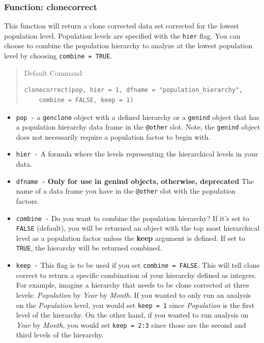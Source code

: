 \documentclass[letterpaper]{article}\usepackage[]{graphicx}\usepackage[]{color}
\makeatletter
\newenvironment{kframe}{%
 \def\at@end@of@kframe{}%
 \ifinner\ifhmode%
  \def\at@end@of@kframe{\end{minipage}}%
  \begin{minipage}{\columnwidth}%
 \fi\fi%
 \def\FrameCommand##1{\hskip\@totalleftmargin \hskip-\fboxsep
 \colorbox{shadecolor}{##1}\hskip-\fboxsep
     \hskip-\linewidth \hskip-\@totalleftmargin \hskip\columnwidth}%
 \MakeFramed {\advance\hsize-\width
   \@totalleftmargin\z@ \linewidth\hsize
   \@setminipage}}%
 {\par\unskip\endMakeFramed%
 \at@end@of@kframe}
\newenvironment{knitrout}{}{} %
\newcommand{\tab}{\hspace*{1em}}
\makeatother
\begin{document}
\subsubsection{Function: clonecorrect}
\label{data.manip:cc:clonecorrect}

\tab\tab This function will return a clone corrected data set corrected for the
lowest population level. Population levels are specified with the \texttt{hier}
flag. You can choose to combine the population hierarchy to analyze at the
lowest population level by choosing \texttt{combine = TRUE}.

\begin{quote}
Default Command:
\begin{knitrout}
\color{fgcolor}\begin{kframe}
\begin{verbatim}
clonecorrect(pop, hier = 1, dfname = "population_hierarchy", 
    combine = FALSE, keep = 1)
\end{verbatim}
\end{kframe}
\end{knitrout}

\end{quote}
\begin{itemize}
  \item \texttt{pop -} a \texttt{genclone} object with a defined hierarchy or a
   \texttt{genind} object that has a population hierarchy data frame in the 
   \texttt{@other} slot. Note, the \texttt{genind} object does not necessarily 
   require a population factor to begin with. 
  \item \texttt{hier -} A formula where the levels representing the hierarchical
   levels in your data. 
  \item \texttt{dfname -} \textbf{Only for use in genind objects, otherwise, deprecated}
   The name of a data frame you have in the \texttt{@other} slot with the population factors. 
  \item \texttt{combine -} Do you want to combine the population hierarchy? 
   If it's set to \texttt{FALSE} (default), you will be returned an object with 
   the top most hierarchical level as a population factor unless the \textbf{keep}
   argument is defined. If set to \texttt{TRUE}, the hierarchy will be returned
   combined. 
  \item \texttt{keep -} This flag is to be used if you set \texttt{combine = FALSE}. 
   This will tell clone correct to return a specific combination of your hierarchy
   defined as integers.
   For example, imagine a hierarchy that needs to be clone corrected at three levels: 
   \textit{Population} by \textit{Year} by \textit{Month}. If you wanted to only 
   run an analysis on the \textit{Population} level, you would set \texttt{keep = 1} 
   since \textit{Population} is the first level of the hierarchy. On the other hand, 
   if you wanted to run analysis on \textit{Year} by \textit{Month}, you would set 
   \texttt{keep = 2:3} since those are the second and third levels of the hierarchy. 
\end{itemize}
\end{document}
